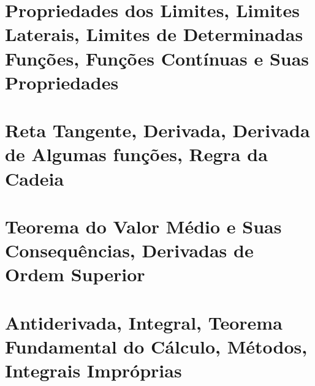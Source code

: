 \documentclass{article}
\begin{document}
\newpage

\section{Propriedades dos Limites, Limites Laterais, Limites de Determinadas Fun\c c\~oes, Fun\c c\~oes Cont\'inuas e Suas Propriedades}

\newpage

\section{Reta Tangente, Derivada, Derivada de Algumas fun\c c\~oes, Regra da Cadeia}

\newpage

\section{Teorema do Valor M\'edio e Suas Consequ\^encias, Derivadas de Ordem Superior}

\newpage

\section{Antiderivada, Integral, Teorema Fundamental do C\'alculo, M\'etodos, Integrais Impr\'oprias}
\end{document}
